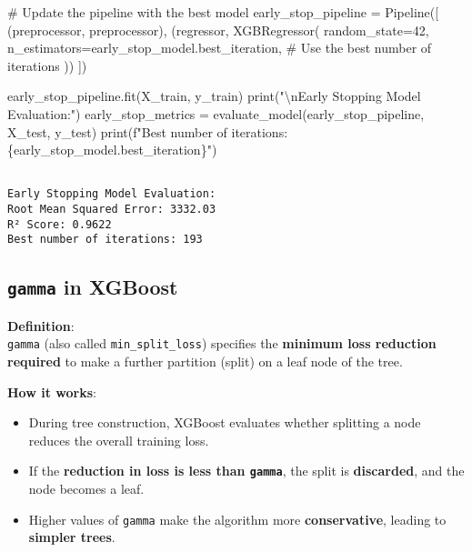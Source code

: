 \documentclass[
  letterpaper,
  DIV=11,
  numbers=noendperiod]{scrreprt}
\newenvironment{Shaded}{\begin{snugshade}}{\end{snugshade}}
\newcommand{\BuiltInTok}[1]{\textcolor[rgb]{0.00,0.23,0.31}{#1}}
\newcommand{\CharTok}[1]{\textcolor[rgb]{0.13,0.47,0.30}{#1}}
\newcommand{\CommentTok}[1]{\textcolor[rgb]{0.37,0.37,0.37}{#1}}
\newcommand{\DecValTok}[1]{\textcolor[rgb]{0.68,0.00,0.00}{#1}}
\newcommand{\NormalTok}[1]{\textcolor[rgb]{0.00,0.23,0.31}{#1}}
\newcommand{\OperatorTok}[1]{\textcolor[rgb]{0.37,0.37,0.37}{#1}}
\newcommand{\SpecialCharTok}[1]{\textcolor[rgb]{0.37,0.37,0.37}{#1}}
\newcommand{\SpecialStringTok}[1]{\textcolor[rgb]{0.13,0.47,0.30}{#1}}
\newcommand{\StringTok}[1]{\textcolor[rgb]{0.13,0.47,0.30}{#1}}
\providecommand{\tightlist}{%
  \setlength{\itemsep}{0pt}\setlength{\parskip}{0pt}}\usepackage{longtable,booktabs,array}
\begin{document}
\begin{Shaded}
\begin{Highlighting}[]
\CommentTok{\# Update the pipeline with the best model}
\NormalTok{early\_stop\_pipeline }\OperatorTok{=}\NormalTok{ Pipeline([}
\NormalTok{    (}\StringTok{\textquotesingle{}preprocessor\textquotesingle{}}\NormalTok{, preprocessor),}
\NormalTok{    (}\StringTok{\textquotesingle{}regressor\textquotesingle{}}\NormalTok{, XGBRegressor(}
\NormalTok{        random\_state}\OperatorTok{=}\DecValTok{42}\NormalTok{,}
\NormalTok{        n\_estimators}\OperatorTok{=}\NormalTok{early\_stop\_model.best\_iteration,  }\CommentTok{\# Use the best number of iterations}
\NormalTok{    ))}
\NormalTok{])}

\NormalTok{early\_stop\_pipeline.fit(X\_train, y\_train)}
\BuiltInTok{print}\NormalTok{(}\StringTok{"}\CharTok{\textbackslash{}n}\StringTok{Early Stopping Model Evaluation:"}\NormalTok{)}
\NormalTok{early\_stop\_metrics }\OperatorTok{=}\NormalTok{ evaluate\_model(early\_stop\_pipeline, X\_test, y\_test)}
\BuiltInTok{print}\NormalTok{(}\SpecialStringTok{f"Best number of iterations: }\SpecialCharTok{\{}\NormalTok{early\_stop\_model}\SpecialCharTok{.}\NormalTok{best\_iteration}\SpecialCharTok{\}}\SpecialStringTok{"}\NormalTok{)}
\end{Highlighting}
\end{Shaded}

\begin{verbatim}

Early Stopping Model Evaluation:
Root Mean Squared Error: 3332.03
R² Score: 0.9622
Best number of iterations: 193
\end{verbatim}

\subsection{\texorpdfstring{\texttt{gamma} in
XGBoost}{gamma in XGBoost}}\label{gamma-in-xgboost}

\textbf{Definition}:\\
\texttt{gamma} (also called \texttt{min\_split\_loss}) specifies the
\textbf{minimum loss reduction required} to make a further partition
(split) on a leaf node of the tree.

\textbf{How it works}:

\begin{itemize}
\tightlist
\item
  During tree construction, XGBoost evaluates whether splitting a node
  reduces the overall training loss.
\item
  If the \textbf{reduction in loss is less than \texttt{gamma}}, the
  split is \textbf{discarded}, and the node becomes a leaf.
\item
  Higher values of \texttt{gamma} make the algorithm more
  \textbf{conservative}, leading to \textbf{simpler trees}.
\end{itemize}
\end{document}

